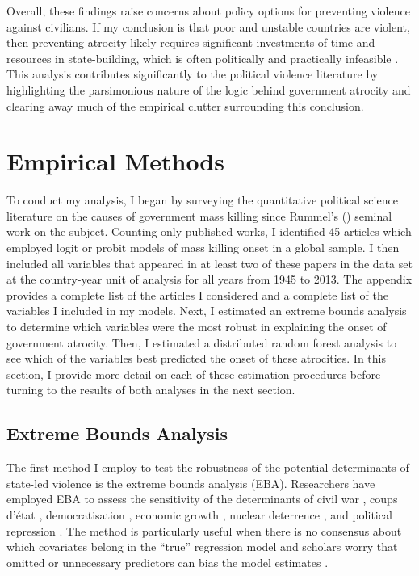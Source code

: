 Overall, these findings raise concerns about policy options for preventing violence against civilians. If my conclusion is that poor and unstable countries are violent, then preventing atrocity likely requires significant investments of time and resources in state-building, which is often politically and practically infeasible \citep{doyle2006making}.  This analysis contributes significantly to the political violence literature by highlighting the parsimonious nature of the logic behind government atrocity and clearing away much of the empirical clutter surrounding this conclusion. 
	
\section{Empirical Methods}
\label{sec:methods}
	
To conduct my analysis, I began by surveying the quantitative political science literature on the causes of government mass killing since Rummel's (\citeyear{rummel1995democracy}) seminal work on the subject. Counting only published works, I identified 45 articles which employed logit or probit models of mass killing onset in a global sample. I then included all variables that appeared in at least two of these papers in the data set at the country-year unit of analysis for all years from 1945 to 2013. The appendix provides a complete list of the articles I considered and a complete list of the variables I included in my models. Next, I estimated an extreme bounds analysis to determine which variables were the most robust in explaining the onset of government atrocity. Then, I estimated a distributed random forest analysis to see which of the variables best predicted the onset of these atrocities. In this section, I provide more detail on each of these estimation procedures before turning to the results of both analyses in the next section.

\subsection{Extreme Bounds Analysis}
\label{subsec:eba}

The first method I employ to test the robustness of the potential determinants of state-led violence is the extreme bounds analysis (EBA). Researchers have employed EBA to assess the sensitivity of the determinants of civil war \citep{hegre2006sensitivity}, coups d'état \citep{gassebner2016expect}, democratisation \citep{gassebner2013extreme}, economic growth \citep{levine1992sensitivity, sala1997just}, nuclear deterrence \citep{bell2015examining}, and political repression \citep{hafner2005right}. The method is particularly useful when there is no consensus about which covariates belong in the ``true'' regression model \citep[178]{sala1997just} and scholars worry that omitted or unnecessary predictors can bias the model estimates \citep[60]{angrist2008mostly, clarke2005phantom, elwert2014endogenous, spector2011methodological}.

